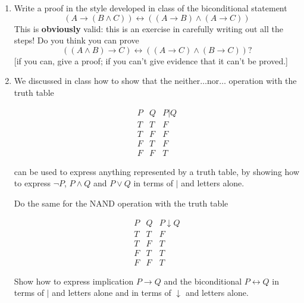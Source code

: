 \documentclass[12pt]{article}
\begin{document}
\begin{enumerate}
\item  Write a proof in the style developed in class of the biconditional statement $$(A \rightarrow (B \wedge C)) \leftrightarrow ((A \rightarrow B) \wedge (A \rightarrow C))$$  This is {\bf obviously} valid:  this is an exercise in carefully writing out all the steps!   Do you think you can prove $$((A \wedge B) \rightarrow C) \leftrightarrow ((A \rightarrow C) \wedge (B \rightarrow C))?$$ [if you can, give a proof;  if you can't give evidence that it can't be proved.]

\item We discussed in class how to show that the neither$\ldots$nor$\ldots$ operation with the truth table

$$\begin{array}{cc|c}

P  & Q & P|Q \\

\hline

T & T & F \\

T & F & F \\

F & T & F \\

F & F & T \end{array}$$

can be used to express anything represented by a truth table, by showing how to express $\neg P$, $P \wedge Q$ and $P \vee Q$ in terms of $|$ and letters alone.

Do the same for the NAND  operation with the truth table

$$\begin{array}{cc|c}

P  & Q & P\downarrow Q \\

\hline

T & T & F \\

T & F & T \\

F & T & T \\

F & F & T \end{array}$$

Show how to express  implication $P \rightarrow Q$ and the biconditional $P \leftrightarrow Q$ in terms of $|$ and letters alone and in terms of $\downarrow$ and letters alone.

\begin{comment}


\end{comment}
\end{enumerate}
\end{document}
